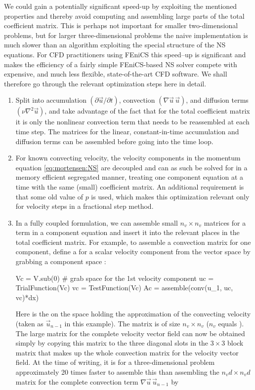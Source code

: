 We could gain a potentially significant speed-up by exploiting the
mentioned properties and thereby avoid computing and assembling large
parts of the total coefficient matrix.
This is perhaps not important for smaller two-dimensional problems,
but for larger three-dimensional problems the naive implementation is
much slower than an algorithm exploiting the special structure of the
NS equations.  For CFD practitioners using FEniCS this speed--up is
significant and makes the efficiency of a fairly simple FEniCS-based NS
solver compete with expensive, and much less flexible, state-of-the-art
CFD software.  We shall therefore go through the relevant optimization
steps here in detail.
\begin{enumerate}
 \item Split  into accumulation $(\partial \vec{u}/\partial t)$,
   convection $(\nabla \vec{u} \, \vec{u})$, and diffusion terms
   $(\nu\nabla^2 \vec{u})$, and take advantage of the fact that for the total
   coefficient matrix it is only the nonlinear convection term that
   needs to be reassembled at each time step. The matrices for the
   linear, constant-in-time accumulation and diffusion terms can be
   assembled before going into the time loop.

\item For known convecting velocity, the velocity components in
  the momentum equation \eqref{eq:mortensen:NS} are decoupled and
  can as such be solved for in a memory efficient segregated manner,
  treating one component equation at a time with the same (small)
  coefficient matrix. An additional requirement is that some old value
  of $p$ is used, which makes this optimization relevant only for
  velocity steps in a fractional step method.

\item In a fully coupled formulation, we can assemble small
  $n_v\times n_v$ matrices for a term in a component equation and
  insert it into the relevant places in the total coefficient matrix.
  For example, to assemble a convection matrix for one component,
  define a  for a scalar velocity component from
  the vector space  by grabbing a component space :
\begin{python}
Vc = V.sub(0)  # grab space for the 1st velocity component
uc = TrialFunction(Vc)
vc = TestFunction(Vc)
Ac = assemble(conv(u_1, uc, vc)*dx)
\end{python}
Here  is the  on the space  holding the
approximation of the convecting velocity (taken as $\vec{u}_{n-1}$ in
this example).  The matrix  is of size $n_v\times n_v$ ($n_v$
equals ).  The large matrix for the complete velocity
vector field can now be obtained simply by copying this 
matrix to the three diagonal slots in the $3\times 3$ block matrix
that makes up the whole convection matrix for the velocity vector
field.  At the time of writing, it is for a three-dimensional problem
approximately 20 times faster to assemble this  than
assembling the $n_vd\times n_vd$ matrix for the complete convection
term $\nabla \vec{u} \, \vec{u}_{n-1}$ by 


\end{enumerate}
